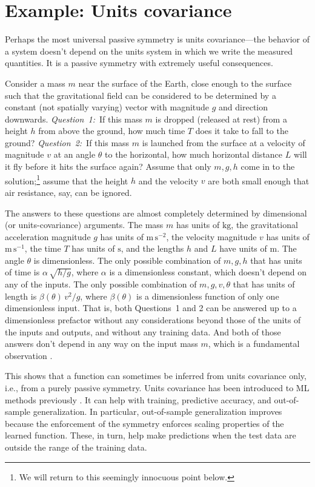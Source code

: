 \documentclass{article}
\theoremstyle{plain}
\theoremstyle{definition}
\theoremstyle{remark}
\newcommand{\unit}[1]{\mathrm{#1}}
\newcommand{\kg}{\unit{kg}}
\newcommand{\m}{\unit{m}}
\newcommand{\s}{\unit{s}}
\begin{document}
\section{Example: Units covariance}\label{sec:units}

Perhaps the most universal passive symmetry is units covariance---the behavior of a system doesn't depend on the units system in which we write the measured quantities.
It is a passive symmetry with extremely useful consequences.

Consider a mass $m$ near the surface of the Earth, close enough to the surface such that the gravitational field can be considered to be determined by a constant (not spatially varying) vector with magnitude $g$ and direction downwards.
\textsl{Question~1:}~If this mass $m$ is dropped (released at rest) from a height $h$ from above the ground, how much time $T$ does it take to fall to the ground?
\textsl{Question~2:}~If this mass $m$ is launched from the surface at a velocity of magnitude $v$ at an angle $\theta$ to the horizontal, how much horizontal distance $L$ will it fly before it hits the surface again?
Assume that only $m, g, h$ come in to the solution;\footnote{We will return to this seemingly innocuous point below.} assume that the height $h$ and the velocity $v$ are both small enough that air resistance, say, can be ignored.

The answers to these questions are almost completely determined by dimensional (or units-covariance) arguments.
The mass $m$ has units of $\kg$, the gravitational acceleration magnitude $g$ has units of $\m\,\s^{-2}$, the velocity magnitude $v$ has units of $\m\,\s^{-1}$, the time $T$ has units of $\s$, and the lengths $h$ and $L$ have units of $\m$.
The angle $\theta$ is dimensionless.
The only possible combination of $m, g, h$ that has units of time is $\alpha\,\sqrt{h/g}$, where $\alpha$ is a dimensionless constant, which doesn't depend on any of the inputs.
The only possible combination of $m, g, v, \theta$ that has units of length is $\beta(\theta)\,v^2/g$, where $\beta(\theta)$ is a dimensionless function of only one dimensionless input.
That is, both Questions~1 and 2 can be answered up to a dimensionless prefactor without any considerations beyond those of the units of the inputs and outputs, and without any training data.
And both of those answers don't depend in any way on the input mass $m$, which is a fundamental observation \cite{gr}.

This shows that a function can sometimes be inferred from units covariance only, i.e., from a purely passive symmetry.
Units covariance has been introduced to ML methods previously \cite{villar2022dimensionless, bakarji2022dimensionally, xie2022data}.
It can help with training, predictive accuracy, and out-of-sample generalization.
In particular, out-of-sample generalization improves because the enforcement of the symmetry enforces scaling properties of the learned function.
These, in turn, help make predictions when the test data are outside the range of the training data.
\end{document}

